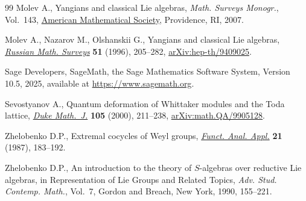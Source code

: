 \documentclass[10pt,a4paper]{article}
\numberwithin{equation}{section}
\providecommand{\LastPageEnding}{}
\begin{document}
\begin{thebibliography}{99}
Molev A., Yangians and classical {L}ie algebras, \textit{Math. Surveys
 Monogr.}, Vol.~143, \href{https://doi.org/10.1090/surv/143}{American Mathematical Society}, Providence, RI, 2007.

Molev A., Nazarov M., Olshanskii G., Yangians and classical {L}ie algebras,
  \href{https://doi.org/10.1070/RM1996v051n02ABEH002772}{\textit{Russian Math. Surveys}} \textbf{51} (1996), 205--282,
 \href{https://arxiv.org/abs/hep-th/9409025}{arXiv:hep-th/9409025}.

Sage Developers, {S}ageMath, the {S}age {M}athematics {S}oftware {S}ystem,
 {V}ersion 10.5, 2025, available at \url{https://www.sagemath.org}.

Sevostyanov A., Quantum deformation of {W}hittaker modules and the {T}oda
 lattice, \href{https://doi.org/10.1215/S0012-7094-00-10522-4}{\textit{Duke Math.~J.}} \textbf{105} (2000), 211--238,
 \href{https://arxiv.org/abs/math.QA/9905128}{arXiv:math.QA/9905128}.

Zhelobenko D.P., Extremal cocycles of {W}eyl groups, \href{https://doi.org/10.1007/BF02577133}{\textit{Funct. Anal.
 Appl.}} \textbf{21} (1987), 183--192.

Zhelobenko D.P., An introduction to the theory of {$S$}-algebras over reductive
 {L}ie algebras, in Representation of {L}ie {G}roups and {R}elated {T}opics,
 \textit{Adv. Stud. Contemp. Math.}, Vol.~7, Gordon and Breach, New York,
 1990, 155--221.

\end{thebibliography}\LastPageEnding
	
	
\end{document}
